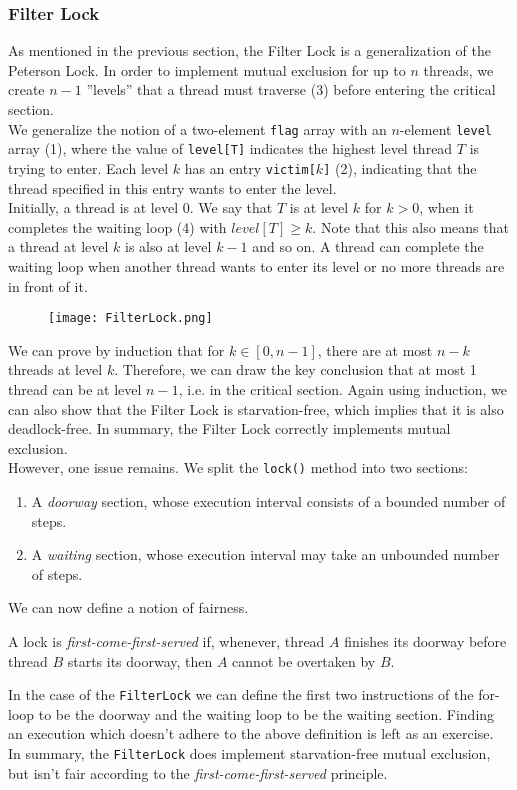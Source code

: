 \documentclass[main]{subfiles}
\begin{document}

\subsubsection{Filter Lock}
As mentioned in the previous section, the Filter Lock is a generalization of the Peterson Lock. In order to implement mutual exclusion for up to $n$ threads, we create $n-1$ ''levels'' that a thread must traverse (3) before entering the critical section. \\[3mm]
We generalize the notion of a two-element \texttt{flag} array with an $n$-element \texttt{level} array (1), where the value of \texttt{level[T]} indicates the highest level thread $T$ is trying to enter. Each level $k$ has an entry \texttt{victim[$k$]} (2), indicating that the thread specified in this entry wants to enter the level.\\[3mm]
Initially, a thread is at level 0. We say that $T$ is at level $k$ for $k>0$, when it completes the waiting loop (4) with $level[T]\geq k$. Note that this also means that a thread at level $k$ is also at level $k-1$ and so on. A thread can complete the waiting loop when another thread wants to enter its level or no more threads are in front of it.\\[3mm]
\begin{figure}[H]
    \centering
    \texttt{[image: FilterLock.png]}
\end{figure}
\noindent We can prove by induction that for $k \in [0,n-1]$, there are at most $n-k$ threads at level $k$. Therefore, we can draw the key conclusion that at most 1 thread can be at level $n-1$, i.e. in the critical section. Again using induction, we can also show that the Filter Lock is starvation-free, which implies that it is also deadlock-free. In summary, the Filter Lock correctly implements mutual exclusion.\\[3mm]
However, one issue remains. We split the \texttt{lock()} method into two sections:
\begin{enumerate}
    \item A \textit{doorway} section, whose execution interval consists of a bounded number of steps.
    \item A \textit{waiting} section, whose execution interval may take an unbounded number of steps.
\end{enumerate}
We can now define a notion of fairness.
\begin{definition}
    A lock is \textit{first-come-first-served} if, whenever, thread $A$ finishes its doorway before thread $B$ starts its doorway, then $A$ cannot be overtaken by $B$.
\end{definition}
In the case of the \texttt{FilterLock} we can define the first two instructions of the for-loop to be the doorway and the waiting loop to be the waiting section. Finding an execution which doesn't adhere to the above definition is left as an exercise.\\[3mm]
In summary, the \texttt{FilterLock} does implement starvation-free mutual exclusion, but isn't fair according to the \textit{first-come-first-served} principle.
\end{document}
